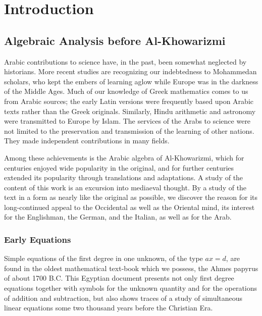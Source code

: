 \documentclass[11pt,a4paper,twoside]{book}
\begin{document}
\tableofcontents

\mainmatter

\part{Introduction}

\chapter{Algebraic Analysis before Al-Khowarizmi}

Arabic contributions to science have, in the past, been somewhat neglected by historians. More recent studies are recognizing our indebtedness to Mohammedan scholars, who kept the embers of learning aglow while Europe was in the darkness of the Middle Ages. Much of our knowledge of Greek mathematics comes to us from Arabic sources; the early Latin versions were frequently based upon Arabic texts rather than the Greek originals. Similarly, Hindu arithmetic and astronomy were transmitted to Europe by Islam. The services of the Arabs to science were not limited to the preservation and transmission of the learning of other nations. They made independent contributions in many fields.

Among these achievements is the Arabic algebra of Al-Khowarizmi, which for centuries enjoyed wide popularity in the original, and for further centuries extended its popularity through translations and adaptations. A study of the content of this work is an excursion into mediaeval thought. By a study of the text in a form as nearly like the original as possible, we discover the reason for its long-continued appeal to the Occidental as well as the Oriental mind, its interest for the Englishman, the German, and the Italian, as well as for the Arab.

\section{Early Equations}

Simple equations of the first degree in one unknown, of the type $ax = d$, are found in the oldest mathematical text-book which we possess, the Ahmes papyrus of about 1700 B.C. This Egyptian document presents not only first degree equations together with symbols for the unknown quantity and for the operations of addition and subtraction, but also shows traces of a study of simultaneous linear equations some two thousand years before the Christian Era.
\end{document}
